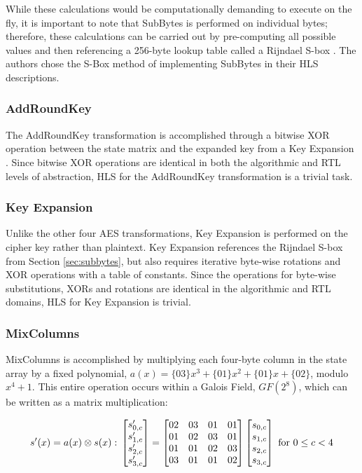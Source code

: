\documentclass[11pt,journal,compsoc, onecolumn]{IEEEtran}
\begin{document}
While these calculations would be computationally demanding to execute on the fly\cite{15}, it is important to note that SubBytes is performed on individual bytes; therefore, these calculations can be carried out by pre-computing all possible values and then referencing a 256-byte lookup table called a Rijndael S-box \cite{13}. The authors chose the S-Box method of implementing SubBytes in their HLS descriptions. 
\subsubsection{AddRoundKey}\label{sec:addroundkey}
The AddRoundKey transformation is accomplished through a bitwise XOR operation between the state matrix and the expanded key from a Key Expansion \cite{17}. Since bitwise XOR operations are identical in both the algorithmic and RTL levels of abstraction, HLS for the AddRoundKey transformation is a trivial task. 

\subsubsection{Key Expansion}\label{sec:keyexpansion}
Unlike the other four AES transformations, Key Expansion is performed on the cipher key rather than plaintext. Key Expansion references the Rijndael S-box from Section \ref{sec:subbytes}, but also requires iterative byte-wise rotations and XOR operations with a table of constants. Since the operations for byte-wise substitutions, XORs and rotations are identical in the algorithmic and RTL domains, HLS for Key Expansion is trivial. 

\subsubsection{MixColumns}\label{sec:mixcolumns}
MixColumns is accomplished by multiplying each four-byte column in the state array by a fixed polynomial, $a(x)=\text{\{03\}}x^3+\text{\{01\}}x^2+\text{\{01\}}x+\text{\{02\}}$, modulo $x^4+1$. This entire operation occurs within a Galois Field, $GF(2^8)$, which can be written as a matrix multiplication\cite{13}:

\begin{equation}\label{eq:mixcolumns}
	s'(x)=a(x)\otimes s(x):\\
	\begin{bmatrix}
		s'_{0,c} \\
		s'_{1,c} \\
		s'_{2,c} \\
		s'_{3,c} 
	\end{bmatrix}
	=
	\begin{bmatrix}
		02 & 03 & 01 & 01 \\
		01 & 02 & 03 & 01 \\
		01 & 01 & 02 & 03 \\
		03 & 01 & 01 & 02 
	\end{bmatrix}
	\begin{bmatrix}
		s_{0,c} \\
		s_{1,c} \\
		s_{2,c} \\
		s_{3,c} 
	\end{bmatrix}
	\text{ for }
	0\leq c<4
\end{equation}
\end{document}
